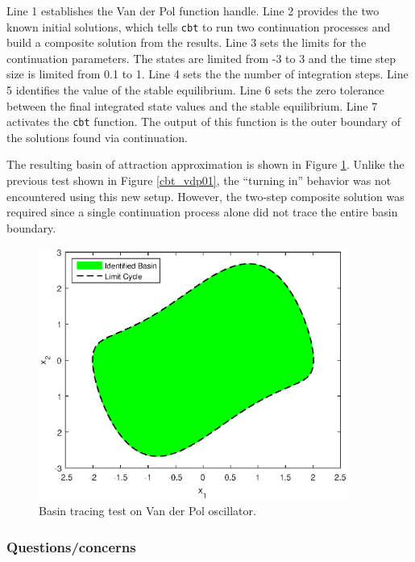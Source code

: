 \documentclass[12pt]{article}
\begin{document}
\noindent Line 1 establishes the Van der Pol function handle. Line 2 provides the two known initial solutions, which tells \texttt{cbt} to run two continuation processes and build a composite solution from the results. Line 3 sets the limits for the continuation parameters. The states are limited from -3 to 3 and the time step size is limited from 0.1 to 1. Line 4 sets the the number of integration steps. Line 5 identifies the value of the stable equilibrium. Line 6 sets the zero tolerance between the final integrated state values and the stable equilibrium. Line 7 activates the \texttt{cbt} function. The output of this function is the outer boundary of the solutions found via continuation.

The resulting basin of attraction approximation is shown in Figure \ref{cbt_vdp02}. Unlike the previous test shown in Figure \ref{cbt_vdp01}, the ``turning in'' behavior was not encountered using this new setup. However, the two-step composite solution was required since a single continuation process alone did not trace the entire basin boundary.

\begin{figure}[H]
\begin{center}
\includegraphics[width=4in]{cbt_vdp02.eps}
\caption{Basin tracing test on Van der Pol oscillator.}
\label{cbt_vdp02}
\end{center}
\end{figure}

\subsubsection{Questions/concerns}
\end{document}
